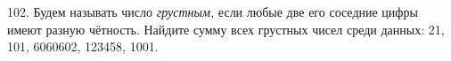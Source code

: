 102. Будем называть число {\it грустным,} если любые две его соседние цифры имеют разную чётность. Найдите сумму всех грустных чисел среди данных: 21, 101, 6060602, 123458, 1001.\\
